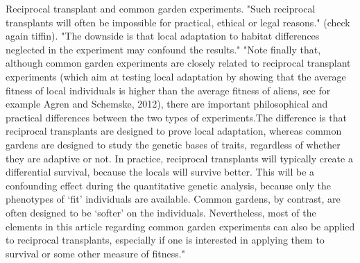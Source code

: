 \documentclass[10pt,letterpaper]{article}
\begin{document}
Reciprocal transplant and common garden experiments. 
"Such reciprocal transplants will often be impossible for practical, ethical or legal reasons." \cite{Tiffin:2014ft,Kawecki:2004hx} (check again tiffin). "The downside is that local adaptation to habitat differences neglected in the experiment may confound the results." \cite{Kawecki:2004hx} 
"Note finally that, although common garden experiments are closely related to reciprocal transplant experiments (which aim at testing local adaptation by showing that the average fitness of local individuals is higher than the average fitness of aliens, see for example Agren and Schemske, 2012), there are important philosophical and practical differences between the two types of experiments.The difference is that reciprocal transplants are designed to prove local adaptation, whereas common gardens are designed to study the genetic bases of traits, regardless of whether they are adaptive or not. In practice, reciprocal transplants will typically create a differential survival, because the locals will survive better. This will be a confounding effect during the quantitative genetic analysis, because only the phenotypes of ‘fit’ individuals are available. Common gardens, by contrast, are often designed to be ‘softer’ on the individuals. Nevertheless, most of the elements in this article regarding common garden experiments can also be applied to reciprocal transplants, especially if one is interested in applying them to survival or some other measure of fitness." \cite{deVillemereuil:2015ge}
\end{document}
